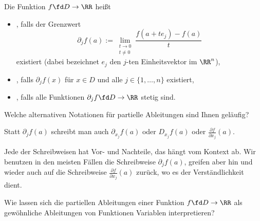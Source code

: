 \begin{antwort}
  Die Funktion $f\fd D\to \RR$ heißt
  {\setlength{\labelsep}{4mm}
    \begin{itemize}
    \item[\desc{a}] , 
      falls der Grenzwert
      \[
      \partial_j f(a) := \lim_{\substack{t\to 0\\t \not=0}} 
      \frac{f(a+te_j)-f(a)}{t}  
      \]
      existiert (dabei bezeichnet $e_j$ den $j$-ten Einheitsvektor im $\RR^n$),

    \item[\desc{b}] , falls 
      $\partial_j f(x)$ für  $x\in D$ und 
      alle $j\in\{1,\ldots,n\}$ existiert,\\[-3.5mm]
    \item[\desc{c}] , 
      falls alle Funktionen $\partial_j f\fd D\to \RR$ stetig sind.
      \AntEnd
    \end{itemize} }
\end{antwort}

\begin{frage}
  Welche alternativen Notationen für partielle Ableitungen sind 
  Ihnen geläufig?
\end{frage}

\begin{antwort}
  Statt $\partial_j f(a)$ schreibt man auch 
  $\partial_{x_j} f(a)$ oder $D_{x_j}f(a)$ oder 
  $\frac{\partial f}{\partial x_j}(a)$. 

  Jede der Schreibweisen hat Vor- und Nachteile, 
  das hängt vom Kontext ab. Wir benutzen in den meisten 
  Fällen die Schreibweise $\partial_j f(a)$, greifen aber hin und wieder 
  auch auf die Schreibweise $\frac{\partial f}{\partial x_j}(a)$ zurück, 
  wo es der Verständlichkeit dient.
  \AntEnd
\end{antwort}

\begin{frage}
  Wie lassen sich die partiellen Ableitungen einer Funktion $f\fd D\to\RR$ 
  als gewöhnliche Ableitungen von Funktionen  Variablen 
  interpretieren?
\end{frage}

